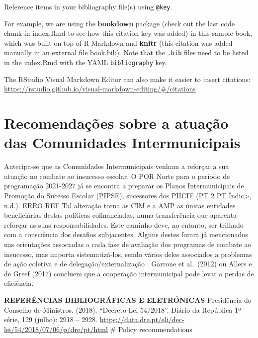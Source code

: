 \documentclass[
]{book}
\begin{document}
Reference items in your bibliography file(s) using \texttt{@key}.

For example, we are using the \textbf{bookdown} package \citep{R-bookdown} (check out the last code chunk in index.Rmd to see how this citation key was added) in this sample book, which was built on top of R Markdown and \textbf{knitr} \citep{xie2015} (this citation was added manually in an external file book.bib).
Note that the \texttt{.bib} files need to be listed in the index.Rmd with the YAML \texttt{bibliography} key.

The RStudio Visual Markdown Editor can also make it easier to insert citations: \url{https://rstudio.github.io/visual-markdown-editing/\#/citations}

\hypertarget{recomendauxe7uxf5es-sobre-a-atuauxe7uxe3o-das-comunidades-intermunicipais}{%
\section{Recomendações sobre a atuação das Comunidades Intermunicipais}\label{recomendauxe7uxf5es-sobre-a-atuauxe7uxe3o-das-comunidades-intermunicipais}}

Antecipa-se que as Comunidades Intermunicipais venham a reforçar a sua atuação no combate ao insucesso escolar. O POR Norte para o período de programação 2021-2027 já se encontra a preparar os Planos Intermunicipais de Promoção do Sucesso Escolar (PIPSE), sucessores dos PIICIE (PT 2 PT Índic\textgreater, n.d.). ERRO REF Tal alteração torna as CIM e a AMP as únicas entidades beneficiárias destas políticas cofinanciadas, numa transferência que aparenta reforçar as suas responsabilidades. Este caminho deve, no entanto, ser trilhado com a consciência dos desafios subjacentes. Alguns destes foram já mencionados nas orientações associadas a cada fase de avaliação dos programas de combate ao insucesso, mas importa sistematizá-los, sendo vários deles associados a problemas de ação coletiva e de delegação/externalização . Garrone et al.~(2012) ou Allers e de Greef (2017) concluem que a cooperação intermunicipal pode levar a perdas de eficiência.

\textbf{REFERÊNCIAS BIBLIOGRÁFICAS E ELETRÓNICAS}
Presidência do Conselho de Ministros. (2018). ``Decreto-Lei 54/2018''. Diário da República 1ª série, 129 (julho): 2918 -- 2928. \url{https://data.dre.pt/eli/dec-lei/54/2018/07/06/p/dre/pt/html}
\# Policy recommendations
\end{document}
